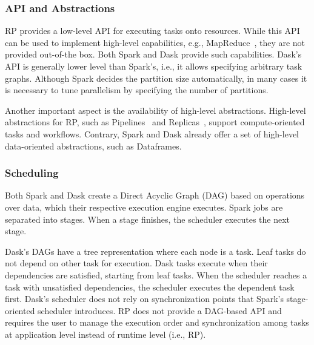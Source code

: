 \subsubsection*{API and Abstractions}

RP provides a low-level API for executing tasks onto resources. While
this API can be used to implement high-level capabilities, e.g.,
MapReduce~\cite{mantha2012pilot}, they are not provided out-of-the box. Both
Spark and Dask provide such capabilities. Dask's API is generally lower level
than Spark's, i.e., it allows specifying arbitrary task graphs. Although Spark
decides the partition size automatically, in many cases it is necessary to tune
parallelism by specifying the number of partitions.

Another important aspect is the availability of high-level abstractions.
High-level abstractions for RP, such as 
Pipelines~\cite{balasubramanian2018harnessing} and 
Replicas~\cite{dakka2018concurrent}, support compute-oriented 
tasks and workflows. Contrary, Spark and Dask already offer a set of
high-level data-oriented abstractions, such as Dataframes. 


\subsubsection*{Scheduling}

Both Spark and Dask create a Direct Acyclic Graph (DAG) based on operations over
data, which their respective execution engine executes. Spark jobs are
separated into stages. When a stage finishes, the scheduler executes the
next stage.

Dask's DAGs have a tree representation where each node is a task. Leaf tasks do
not depend on other task for execution. Dask tasks execute when their
dependencies are satisfied, starting from leaf tasks. When the scheduler reaches a task
with unsatisfied dependencies, the scheduler executes the dependent task first.
Dask's scheduler does not rely on synchronization points that Spark's
stage-oriented scheduler introduces. RP does not provide a DAG-based
API and requires the user to manage the execution order and synchronization
among tasks at application level instead of runtime level (i.e., RP).


